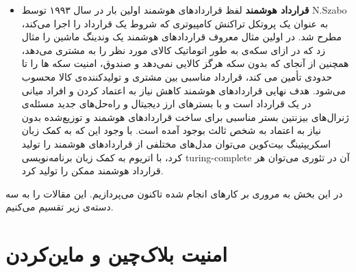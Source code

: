 \begin{itemize}
	\item
	\textbf{قرارداد هوشمند}
	لفظ قرارداد‌های هوشمند اولین بار در سال ۱۹۹۳ توسط N.Szabo 
	\cite{SmartContract}
	به عنوان یک پروتکل تراکنش کامپیوتری که شروط یک قرارداد را اجرا می‌کند، مطرح شد. در اولین مثال معروف قرارداد‌های هوشمند یک وندینگ‌ ماشین
	 را مثال زد که در ازای سکه‌ی به طور اتوماتیک کالای مورد نظر را به مشتری می‌دهد، همچنین از آنجای که بدون سکه هرگز کالایی نمی‌دهد و صندوق، امنیت سکه ها را تا حدودی تأمین می کند، قرارداد مناسبی بین مشتری و تولیدکننده‌ی کالا محسوب می‌شود.
	هدف نهایی قراردادهای هوشمند کاهش نیاز به اعتماد کردن و افراد میانی در یک قرارداد است و با بسترهای ارز دیجیتال و راه‌حل‌های جدید مسئله‌ی ژنرال‌های بیزنتین بستر مناسبی برای ساخت قراردادهای هوشمند و توزیع‌شده بدون نیاز به اعتماد به شخص ثالث بوجود آمده است. 
	با وجود این که به کمک زبان اسکریپتینگ بیت‌کوین می‌توان مدل‌های مختلفی از قرارداد‌های هوشمند را تولید کرد، با اتریوم به کمک زبان برنامه‌نویسی turing-complete آن در تئوری می‌توان هر قرارداد هوشمند ممکن را تولید کرد. 
	
	
\end{itemize}

در این بخش به مروری بر کارهای انجام شده تاکنون می‌پردازیم. این مقالات را به سه دسته‌ی زیر تقسیم می‌کنیم.

\section{امنیت بلاک‌چین و ماین‌کردن}

